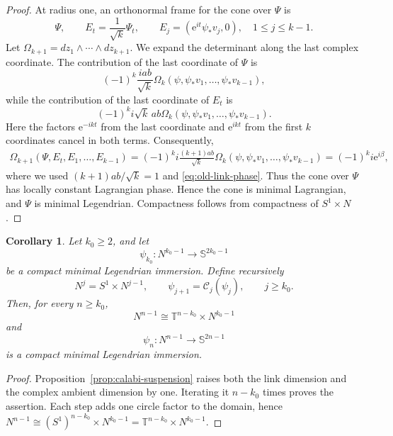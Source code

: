 \documentclass[11pt,a4paper]{article}
\numberwithin{equation}{section}
\newtheorem{corollary}[theorem]{Corollary}
\newcommand{\Sph}{\mathbb S}
\newcommand{\ee}{\mathrm e}
\begin{document}
\begin{proof}
At radius one, an orthonormal frame for the cone over $\Psi$ is
$$
        \Psi,
        \qquad
        E_t=\frac1{\sqrt{k}}\Psi_t,
        \qquad
        E_j=(\ee^{it}\psi_*v_j,0),
        \quad 1\le j\le k-1.
$$
Let $\Omega_{k+1}=dz_1\wedge\cdots\wedge dz_{k+1}.$ We expand the determinant along the last complex coordinate.  The contribution of the last coordinate of $\Psi$ is
$$
        (-1)^k\frac{iab}{\sqrt{k}}
        \Omega_k(\psi,\psi_*v_1,\ldots,\psi_*v_{k-1}),
$$
while the contribution of the last coordinate of $E_t$ is
$$
        (-1)^k i\sqrt{k}\,ab
        \Omega_k(\psi,\psi_*v_1,\ldots,\psi_*v_{k-1}).
$$
Here the factors $\ee^{-ikt}$ from the last coordinate and $\ee^{ikt}$ from the first $k$ coordinates cancel in both terms.  Consequently,
\begin{equation*}
\begin{aligned}
\Omega_{k+1}(\Psi,E_t,E_1,\ldots,E_{k-1})
=(-1)^k i\frac{(k+1)ab}{\sqrt{k}}
\Omega_k(\psi,\psi_*v_1,\ldots,\psi_*v_{k-1})
=(-1)^k i\ee^{i\beta},
\end{aligned}
\end{equation*}
where we used $(k+1)ab/\sqrt{k}=1$ and \eqref{eq:old-link-phase}.  Thus the cone over $\Psi$ has locally constant Lagrangian phase.  Hence the cone is minimal Lagrangian, and $\Psi$ is minimal Legendrian.  Compactness follows from compactness of $S^1\times N$.
\end{proof}

\begin{corollary}\label{cor:iterated-calabi-suspension}
Let $k_0\ge2$, and let
$$
        \psi_{k_0}:N^{k_0-1}\longrightarrow\Sph^{2k_0-1}
$$
be a compact minimal Legendrian immersion.  Define recursively
$$
        N^{j}=S^1\times N^{j-1},
        \qquad
        \psi_{j+1}=\mathcal C_j(\psi_j),
        \qquad j\ge k_0.
$$
Then, for every $n\ge k_0$,
$$
        N^{n-1}\cong\mathbb T^{n-k_0}\times N^{k_0-1}
$$
and
$$
        \psi_n:N^{n-1}\longrightarrow\Sph^{2n-1}
$$
is a compact minimal Legendrian immersion.
\end{corollary}

\begin{proof}
Proposition~\ref{prop:calabi-suspension} raises both the link dimension and the complex ambient dimension by one.  Iterating it $n-k_0$ times proves the assertion.  Each step adds one circle factor to the domain, hence
$
        N^{n-1}\cong(S^1)^{n-k_0}\times N^{k_0-1}
        =\mathbb T^{n-k_0}\times N^{k_0-1}.
$
\end{proof}
\end{document}

